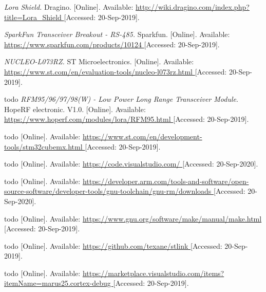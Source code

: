 \begin{thebibliography}{9}
\textit{
Lora Shield.
}
Dragino.
[Online]. Available:
\url{
http://wiki.dragino.com/index.php?title=Lora_Shield
}
[Accessed: 20-Sep-2019].

\textit{
SparkFun Transceiver Breakout - RS-485.
}
Sparkfun.
[Online]. Available:
\url{
https://www.sparkfun.com/products/10124
}
[Accessed: 20-Sep-2019].

\textit{
NUCLEO-L073RZ.
}
ST Microelectronics.
[Online]. Available:
\url{
https://www.st.com/en/evaluation-tools/nucleo-l073rz.html
}
[Accessed: 20-Sep-2019].


 todo
\textit{
RFM95/96/97/98(W) - Low Power Long Range Transceiver Module}.
HopeRF electronic.
V1.0.
[Online]. Available:
\url{
https://www.hoperf.com/modules/lora/RFM95.html
}
[Accessed: 20-Sep-2019].



todo
[Online]. Available:
\url{
https://www.st.com/en/development-tools/stm32cubemx.html
}
[Accessed: 20-Sep-2019].

todo
[Online]. Available:
\url{
https://code.visualstudio.com/
}
[Accessed: 20-Sep-2020].

todo
[Online]. Available:
\url{
https://developer.arm.com/tools-and-software/open-source-software/developer-tools/gnu-toolchain/gnu-rm/downloads
}
[Accessed: 20-Sep-2020].

todo
[Online]. Available:
\url{
https://www.gnu.org/software/make/manual/make.html
}
[Accessed: 20-Sep-2019].

todo
[Online]. Available:
\url{
https://github.com/texane/stlink
}
[Accessed: 20-Sep-2019].

todo
[Online]. Available:
\url{
https://marketplace.visualstudio.com/items?itemName=marus25.cortex-debug
}
[Accessed: 20-Sep-2019].





\end{thebibliography}
